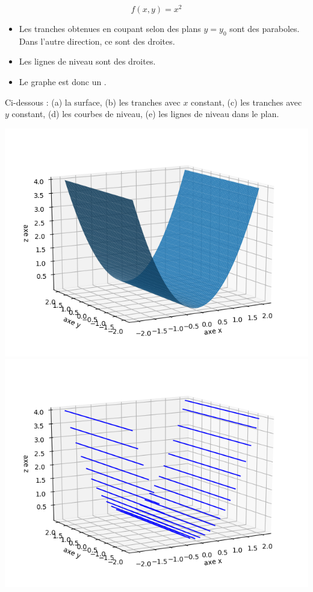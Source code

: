 \documentclass[11pt,class=report,crop=false]{standalone}
\begin{document}
\begin{exemple}
$$f(x,y) = x^2$$



\begin{itemize}
  \item Les tranches obtenues en coupant selon des plans $y=y_0$ sont des paraboles. Dans l'autre direction, ce sont des droites.
  \item Les lignes de niveau sont des droites.
  \item Le graphe est donc un .
\end{itemize}

Ci-dessous : (a) la surface, (b) les tranches avec $x$ constant, (c) les tranches avec $y$ constant, (d) les courbes de niveau, (e) les lignes de niveau dans le plan.
\begin{center}
\includegraphics[scale=\myscale,scale=0.5]{figures/fonctions-quadra-2a}
\includegraphics[scale=\myscale,scale=0.5]{figures/fonctions-quadra-2b}

\end{center}
\end{exemple}
\end{document}
